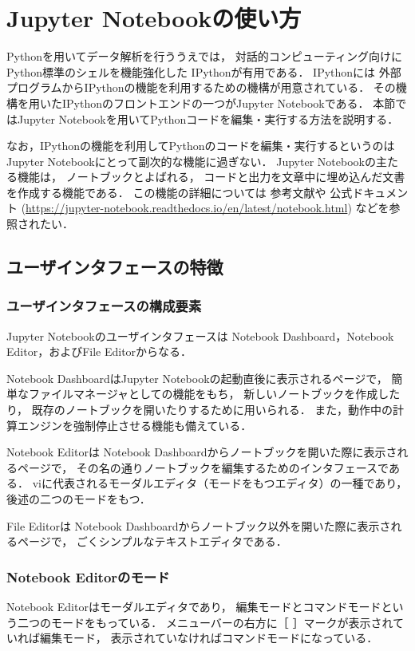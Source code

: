\section{Jupyter Notebookの使い方}\label{sec: Jupyter Notebookの使い方}
Pythonを用いてデータ解析を行ううえでは，
対話的コンピューティング向けにPython標準のシェルを機能強化した
IPythonが有用である．
IPythonには
外部プログラムからIPythonの機能を利用するための機構が用意されている．
その機構を用いたIPythonのフロントエンドの一つがJupyter Notebookである．
本節ではJupyter Notebookを用いてPythonコードを編集・実行する方法を説明する．

なお，IPythonの機能を利用してPythonのコードを編集・実行するというのは
Jupyter Notebookにとって副次的な機能に過ぎない．
Jupyter Notebookの主たる機能は，
ノートブックとよばれる，
コードと出力を文章中に埋め込んだ文書を作成する機能である．
この機能の詳細については
参考文献\cite{rossant2015ipython}や
公式ドキュメント
(\url{https://jupyter-notebook.readthedocs.io/en/latest/notebook.html})
などを参照されたい．


\subsection{ユーザインタフェースの特徴}


\subsubsection{ユーザインタフェースの構成要素}
Jupyter Notebookのユーザインタフェースは
Notebook Dashboard，Notebook Editor，およびFile Editorからなる．

Notebook DashboardはJupyter Notebookの起動直後に表示されるページで，
簡単なファイルマネージャとしての機能をもち，
新しいノートブックを作成したり，
既存のノートブックを開いたりするために用いられる．
また，動作中の計算エンジンを強制停止させる機能も備えている．

Notebook Editorは
Notebook Dashboardからノートブックを開いた際に表示されるページで，
その名の通りノートブックを編集するためのインタフェースである．
viに代表されるモーダルエディタ（モードをもつエディタ）の一種であり，
後述の二つのモードをもつ．

File Editorは
Notebook Dashboardからノートブック以外を開いた際に表示されるページで，
ごくシンプルなテキストエディタである．


\subsubsection{Notebook Editorのモード}
Notebook Editorはモーダルエディタであり，
編集モードとコマンドモードという二つのモードをもっている．
メニューバーの右方に［\,\faPencil\,］マークが表示されていれば編集モード，
表示されていなければコマンドモードになっている．

